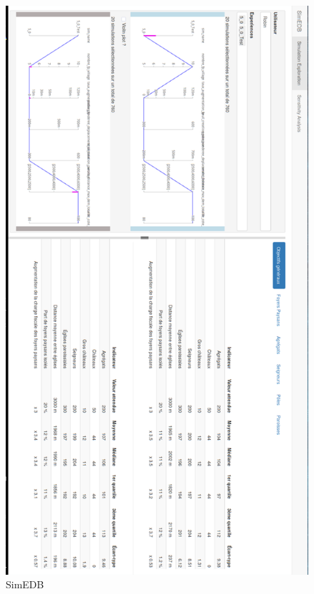 	\clearpage
	\begin{figure}[H]
		\centering
		\includegraphics[width=.94\linewidth]{img/SimEDB_nombreFP_villages_rotate.png}
		\caption{SimEDB }
		\label{fig:simedb_villages}
	\end{figure}
\clearpage

